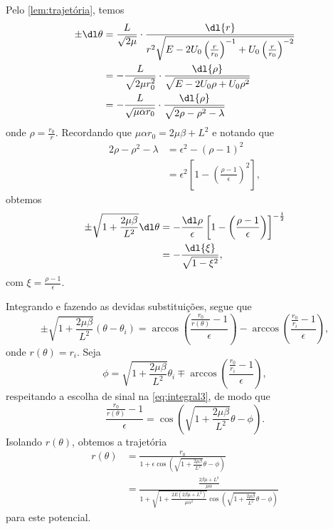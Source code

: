 Pelo \cref{lem:trajetória}, temos
\begin{align}
    \pm \dl\theta &= \frac{L}{\sqrt{2\mu}}\cdot\frac{\dl{r}}{r^2\sqrt{E - 2U_0\left(\frac{r}{r_0}\right)^{-1} + U_0\left(\frac{r}{r_0}\right)^{-2}}}\\
                  &= -\frac{L}{\sqrt{2\mu r_0^2}}\cdot\frac{\dl{\rho}}{\sqrt{E - 2U_0\rho + U_0 \rho^2}}\\
                  &= -\frac{L}{\sqrt{\mu \alpha r_0}} \cdot \frac{\dl{\rho}}{\sqrt{2\rho - \rho^2 - \lambda}}
\end{align}
onde \(\rho = \frac{r_0}{r}\). Recordando que \(\mu \alpha r_0 = 2\mu\beta + L^2\) e notando que
\begin{align}
    2\rho - \rho^2 - \lambda &= \epsilon^2 - (\rho - 1)^2\\
                             &= \epsilon^2\left[1 - \left(\frac{\rho - 1}{\epsilon}\right)^2\right],
\end{align}
obtemos
\begin{align}
    \pm\sqrt{1 + \frac{2\mu\beta}{L^2}}\dl\theta &= -\frac{\dl \rho}{\epsilon} \left[1 - \left(\frac{\rho - 1}{\epsilon}\right)\right]^{-\frac12}\\
                                                 &= -\frac{\dl{\xi}}{\sqrt{1 - \xi^2}},
\end{align}
com \(\xi = \frac{\rho - 1}{\epsilon}\).

Integrando e fazendo as devidas substituições, segue que
\begin{equation}
    \pm \sqrt{1 + \frac{2\mu \beta}{L^2}}\left(\theta - \theta_i\right) = \arccos{\left(\frac{\frac{r_0}{r(\theta)}-1}{\epsilon}\right)} - \arccos{\left(\frac{\frac{r_0}{r_i}-1}{\epsilon}\right)},
    \label{eq:integral3}
\end{equation}
onde \(r(\theta) = r_i\). Seja
\begin{equation}
    \phi = \sqrt{1+\frac{2\mu\beta}{L^2}}\theta_i \mp \arccos{\left(\frac{\frac{r_0}{r_i}-1}{\epsilon}\right)},
\end{equation}
respeitando a escolha de sinal na \cref{eq:integral3}, de modo que
\begin{equation}
    \frac{\frac{r_0}{r(\theta)}-1}{\epsilon} = \cos\left(\sqrt{1 + \frac{2\mu\beta}{L^2}}\theta - \phi\right).
\end{equation}
Isolando \(r(\theta)\), obtemos a trajetória
\begin{align}
    r(\theta) &= \frac{r_0}{1 + \epsilon \cos{\left(\sqrt{1 + \frac{2\mu\beta}{L^2}}\theta - \phi\right)}}\\
              &= \frac{\frac{2 \beta \mu + L^2}{\mu \alpha}}{1 + \sqrt{1 + \frac{2E(2\beta\mu + L^2)}{\mu\alpha^2}}\cos{\left(\sqrt{1+\frac{2\mu \beta}{L^2}}\theta - \phi\right)}}
\end{align}
para este potencial.
